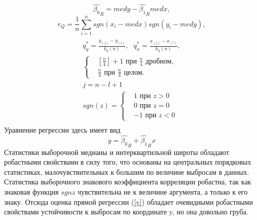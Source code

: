\documentclass[a4paper]{article}
\begin{document}
    \begin{equation}
        \hat{\beta_{0}}_{R} = med y - \hat{\beta_{1}}_{R} med x,
        \label{b_0R}
    \end{equation}
    \begin{equation}
        r_{Q} = \frac{1}{n}\sum_{i=1}^{n}{sgn(x_{i} - med x)sgn(y_{i} - med y)},
        \label{r_Q}
    \end{equation}
    \begin{multline}
    \\
        q^{*}_{y} = \frac{y_{(j)} -y_{(l)}}{k_{q}(n)},~~~
        q^{*}_{x} = \frac{x_{(j)} - x_{(l)}}{k_{q}(n)}, \\ 
        \begin{cases}
             & [\frac{n}{4}] + 1 \text{ при } \frac{n}{4} \text{ дробном, } \\ 
             & \frac{n}{4} \text{ при } \frac{n}{4} \text{ целом. }
        \end{cases}\\
        j = n - l + 1\\
        sgn(z) = \begin{cases}
                    & 1 \text{ при } z > 0 \\ 
                    & 0 \text{ при } z = 0 \\
                    & -1 \text{ при } z < 0
                 \end{cases}\\
        \label{q*}        
    \end{multline}
    Уравнение регрессии здесь имеет вид 
    \begin{equation}
        y = \hat{\beta_{0}}_{R} +  \hat{\beta_{1}}_{R}x
        \label{y}
    \end{equation}
    Статистики выборочной медианы и интерквартильной широты обладают робастными свойствами в силу того, что основаны на центральных порядковых статистиках, малочувствительных к большим по величине выбросам в данных. Статистика выборочного знакового коэффициента корреляции робастна, так как знаковая функция $sgn z$ чувствительна не к величине аргумента, а только к его знаку. Отсюда оценка прямой регрессии (\ref{y}) обладает очевидными робастными свойствами устойчивости к выбросам по координате y, но она довольно груба.
\end{document}
